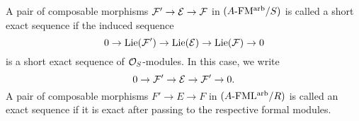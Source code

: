 \documentclass[../main.tex]{subfiles}
\begin{document}
\begin{defi}
  A pair of composable morphisms $\mathcal{F}' \to \mathcal{E} \to \mathcal{F}$ in 
  ${({A}\textnormal-\allowbreak\mathrm{FM^{arb}}/{S})}$ is called 
  a short exact sequence if the induced sequence 
  \begin{equation*}
    0 \to \operatorname{Lie}(\mathcal{F}') \to \operatorname{Lie}(\mathcal{E}) \to \operatorname{Lie}(\mathcal{F}) \to 0
  \end{equation*}
  is a short exact sequence of $\mathcal{O}_S$-modules. In this case, we write
  \begin{equation*}
    0 \to \mathcal{F}' \to \mathcal{E} \to \mathcal{F}' \to 0.
  \end{equation*}
  A pair of composable morphisms $F' \to E \to F$ in ${({A}\textnormal-\allowbreak\mathrm{FML^{arb}}/{R})}$
  is called an exact sequence if it is exact after passing to 
  the respective formal modules. 
\end{defi}
\end{document}
